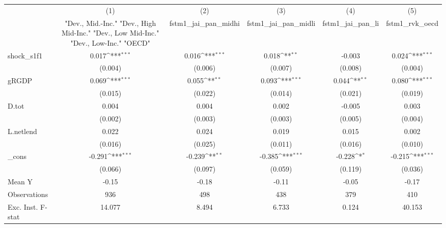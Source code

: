{
\def\sym#1{\ifmmode^{#1}\else\(^{#1}\)\fi}
\begin{tabular}{l*{5}{c}}
\toprule
            &\multicolumn{1}{c}{(1)}&\multicolumn{1}{c}{(2)}&\multicolumn{1}{c}{(3)}&\multicolumn{1}{c}{(4)}&\multicolumn{1}{c}{(5)}\\
            &\multicolumn{1}{c}{ "Dev., Mid.-Inc." "Dev., High Mid-Inc." "Dev., Low Mid-Inc." "Dev., Low-Inc." "OECD" }&\multicolumn{1}{c}{fstm1\_jai\_pan\_midhi}&\multicolumn{1}{c}{fstm1\_jai\_pan\_midli}&\multicolumn{1}{c}{fstm1\_jai\_pan\_li}&\multicolumn{1}{c}{fstm1\_rvk\_oecd}\\
\midrule
shock\_s1f1  &       0.017\sym{***}&       0.016\sym{***}&       0.018\sym{**} &      -0.003         &       0.024\sym{***}\\
            &     (0.004)         &     (0.006)         &     (0.007)         &     (0.008)         &     (0.004)         \\
\addlinespace
gRGDP       &       0.069\sym{***}&       0.055\sym{**} &       0.093\sym{***}&       0.044\sym{**} &       0.080\sym{***}\\
            &     (0.015)         &     (0.022)         &     (0.014)         &     (0.021)         &     (0.019)         \\
\addlinespace
D.tot       &       0.004         &       0.004         &       0.002         &      -0.005         &       0.003         \\
            &     (0.002)         &     (0.003)         &     (0.003)         &     (0.005)         &     (0.004)         \\
\addlinespace
L.netlend   &       0.022         &       0.024         &       0.019         &       0.015         &       0.002         \\
            &     (0.016)         &     (0.025)         &     (0.011)         &     (0.016)         &     (0.010)         \\
\addlinespace
\_cons      &      -0.291\sym{***}&      -0.239\sym{**} &      -0.385\sym{***}&      -0.228\sym{*}  &      -0.215\sym{***}\\
            &     (0.066)         &     (0.097)         &     (0.059)         &     (0.119)         &     (0.036)         \\
\midrule
Mean Y      &       -0.15         &       -0.18         &       -0.11         &       -0.05         &       -0.17         \\
Observations&         936         &         498         &         438         &         379         &         410         \\
Exc. Inst. F-stat&      14.077         &       8.494         &       6.733         &       0.124         &      40.153         \\
\bottomrule
\end{tabular}
}
